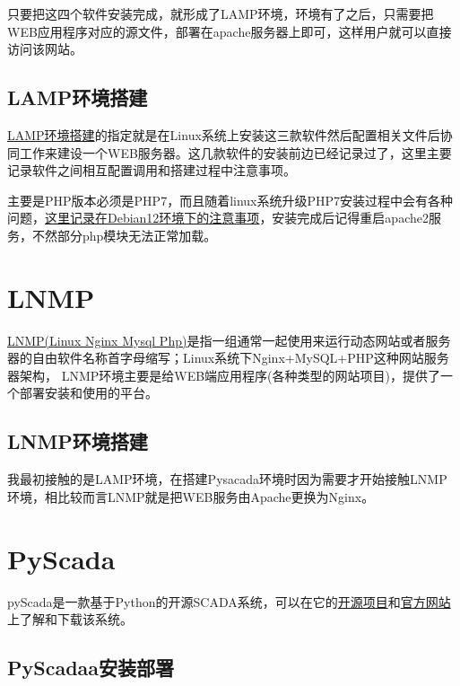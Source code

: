只要把这四个软件安装完成，就形成了LAMP环境，环境有了之后，只需要把WEB应用程序对应的源文件，部署在apache服务器上即可，这样用户就可以直接访问该网站。
\subsection{LAMP环境搭建}
\href{https://blog.csdn.net/weixin_35886269/article/details/116039239?spm=1001.2014.3001.5506}{LAMP环境搭建}的指定就是在Linux系统上安装这三款软件然后配置相关文件后协同工作来建设一个WEB服务器。这几款软件的安装前边已经记录过了，这里主要记录软件之间相互配置调用和搭建过程中注意事项。

主要是PHP版本必须是PHP7，而且随着linux系统升级PHP7安装过程中会有各种问题，\href{https://blog.csdn.net/weinsheimer/article/details/131855546?spm=1001.2014.3001.5506}{这里记录在Debian12环境下的注意事项}，安装完成后记得重启apache2服务，不然部分php模块无法正常加载。
\section{LNMP}
\href{https://blog.csdn.net/G_D0120/article/details/136338594?ops_request_misc=%257B%2522request%255Fid%2522%253A%2522845af08f81d51851cea0a81b281138f3%2522%252C%2522scm%2522%253A%252220140713.130102334..%2522%257D&request_id=845af08f81d51851cea0a81b281138f3&biz_id=0&utm_medium=distribute.pc_search_result.none-task-blog-2~all~sobaiduend~default-2-136338594-null-null.142^v101^pc_search_result_base7&utm_term=lNmp&spm=1018.2226.3001.4187}{LNMP(Linux Nginx Mysql Php)}是指一组通常一起使用来运行动态网站或者服务器的自由软件名称首字母缩写；Linux系统下Nginx+MySQL+PHP这种网站服务器架构， LNMP环境主要是给WEB端应用程序(各种类型的网站项目)，提供了一个部署安装和使用的平台。
\subsection{LNMP环境搭建}
我最初接触的是LAMP环境，在搭建Pysacada环境时因为需要才开始接触LNMP环境，相比较而言LNMP就是把WEB服务由Apache更换为Nginx。
\section{PyScada}
	pyScada是一款基于Python的开源SCADA系统，可以在它的\href{https://gitcode.com/gh_mirrors/py/PyScada/?utm_source=artical_gitcode&index=top&type=card&webUrl&isLogin=1}{开源项目}和\href{https://pyscada.readthedocs.io/en/main/}{官方网站}上了解和下载该系统。
\subsection{PyScadaa安装部署}

